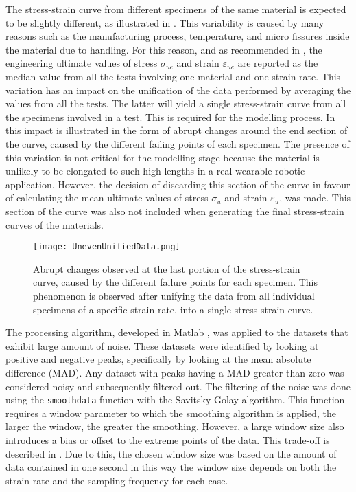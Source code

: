 The stress-strain curve from different specimens of the same material is expected to be slightly different, as illustrated in . This variability is caused by many reasons such as the manufacturing process, temperature, and micro fissures inside the material due to handling. For this reason, and as recommended in \cite{astmd638,astmd412}, the engineering ultimate values of stress $\sigma_{ue}$ and strain $\varepsilon_{ue}$ are reported as the median value from all the tests involving one material and one strain rate. This variation has an impact on the unification of the data performed by averaging the values from all the tests. The latter will yield a single stress-strain curve from all the specimens involved in a test. This is required for the modelling process. In  this impact is illustrated in the form of abrupt changes  around the end section of the curve, caused by the different failing points of each specimen. The presence of this variation is not critical for the modelling stage because the material is unlikely to be elongated to such high lengths in a real wearable robotic application. However, the decision of discarding this section of the curve in favour of calculating the mean ultimate values of stress $\sigma_u$ and strain $\varepsilon_u$, was made. This section of the curve was also not included when generating the final stress-strain curves of the materials.

\begin{figure}[htb!]
    \centering
    \texttt{[image: UnevenUnifiedData.png]}
    \caption{Abrupt changes observed at the last portion of the stress-strain curve, caused by the different failure points for each specimen. This phenomenon is observed after unifying the data from all individual specimens of a specific strain rate, into a single stress-strain curve.}
    \label{fig:unevenData}
\end{figure}

The processing algorithm, developed in Matlab \textregistered{}, was applied to the datasets that exhibit large amount of noise. These datasets were identified by looking at positive and negative peaks, specifically by looking at the mean absolute difference (MAD). Any dataset with peaks having a MAD greater than zero was considered noisy and subsequently filtered out. The filtering of the noise was done using the \texttt{smoothdata} function with the Savitsky-Golay algorithm. This function requires a window parameter to which the smoothing algorithm is applied, the larger the window, the greater the smoothing. However, a large window size also introduces a bias or offset to the extreme points of the data. This trade-off is described in \cite{sadeghi2018optimum}. Due to this, the chosen window size was based on the amount of data contained in one second in this way the window size depends on both the strain rate and the sampling frequency for each case. 

